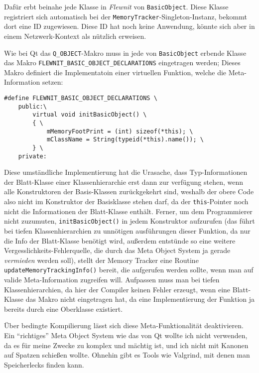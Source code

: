 	Dafür erbt beinahe jede Klasse in \emph{Flewnit} von \lstinline|BasicObject|.
	Diese Klasse registriert sich automatisch bei der \lstinline|MemoryTracker|-Singleton-Instanz, bekommt dort eine
	ID zugewiesen. Diese ID hat noch keine Anwendung, könnte sich aber in einem Netzwerk-Kontext als nützlich erweisen.

	Wie bei Qt das \lstinline[language=C++]|Q_OBJECT|-Makro muss in jede von 
	\lstinline[language=C++]|BasicObject| erbende Klasse das Makro 
	\lstinline[language=C++]|FLEWNIT_BASIC_OBJECT_DECLARATIONS| eingetragen werden; Dieses Makro definiert die 
	Implementatoin einer virtuellen Funktion, welche die Meta-Information setzen:
    \begin{lstlisting}
#define FLEWNIT_BASIC_OBJECT_DECLARATIONS \
	public:\
		virtual void initBasicObject() \
		{ \
			mMemoryFootPrint = (int) sizeof(*this); \
			mClassName = String(typeid(*this).name()); \
		} \
	private:	
	\end{lstlisting}
	Diese umständliche Implementierung hat die Urasache, dass Typ-Informationen der Blatt-Klasse einer
	Klassenhierarchie erst dann zur verfügung stehen, wenn alle Konstruktoren der Basis-Klassen zurückgekehrt sind,
	weshalb der obere Code also nicht im Konstruktor der Basisklasse stehen darf, da der \lstinline|this|-Pointer
	noch nicht die Informationen der Blatt-Klasse enthält.
	Ferner, um dem Programmierer nicht zuzumuten, \lstinline|initBasicObject()| in jedem Konstruktor aufzurufen
	(das führt bei tiefen Klassenhierarchien zu unnötigen ausführungen dieser Funktion, da nur die Info der Blatt-Klasse
	benötigt wird, außerdem entstünde so eine weitere Vergesslichkeits-Fehlerquelle, die durch das Meta Object System ja 
	gerade \emph{vermieden} werden soll), stellt der Memory Tracker eine Routine \lstinline|updateMemoryTrackingInfo()|
	bereit, die aufgerufen werden sollte, wenn man auf valide Meta-Information zugreifen will.
	Aufpassen muss man bei tiefen Klassenhierarchien, da hier der Compiler keinen Fehler erzeugt, wenn eine Blatt-Klasse
	das Makro nicht eingetragen hat, da eine Implementierung der Funktion ja bereits durch eine Oberklasse existiert.
	
	Über bedingte Kompilierung lässt sich diese Meta-Funktionalität deaktivieren.
	Ein "`richtiges"' Meta Object System wie das von Qt wollte ich nicht verwenden, da es für meine Zwecke zu komplex und
	mächtig ist, und ich nicht mit Kanonen auf Spatzen schießen wollte. Ohnehin gibt es Tools wie Valgrind, mit denen
	man Speicherlecks finden kann. 

